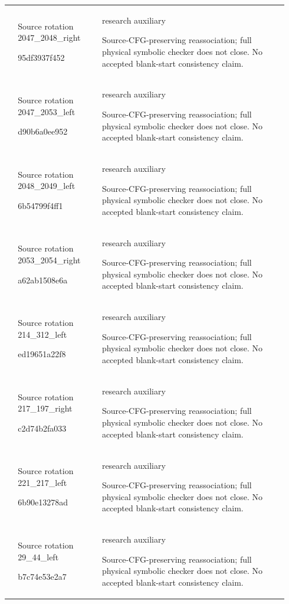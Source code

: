 {\begin{longtable}{@{}>{\raggedright\arraybackslash}p{0.035\linewidth}>{\raggedright\arraybackslash}p{0.28\linewidth}>{\raggedright\arraybackslash}p{0.625\linewidth}@{}}
62 & Source rotation 2047\_2048\_right\par{\ttfamily 95df3937f452} & research auxiliary\par Source-CFG-preserving reassociation; full physical symbolic checker does not close. No accepted blank-start consistency claim.\\[4pt]
63 & Source rotation 2047\_2053\_left\par{\ttfamily d90b6a0ee952} & research auxiliary\par Source-CFG-preserving reassociation; full physical symbolic checker does not close. No accepted blank-start consistency claim.\\[4pt]
64 & Source rotation 2048\_2049\_left\par{\ttfamily 6b54799f4ff1} & research auxiliary\par Source-CFG-preserving reassociation; full physical symbolic checker does not close. No accepted blank-start consistency claim.\\[4pt]
65 & Source rotation 2053\_2054\_right\par{\ttfamily a62ab1508e6a} & research auxiliary\par Source-CFG-preserving reassociation; full physical symbolic checker does not close. No accepted blank-start consistency claim.\\[4pt]
66 & Source rotation 214\_312\_left\par{\ttfamily ed19651a22f8} & research auxiliary\par Source-CFG-preserving reassociation; full physical symbolic checker does not close. No accepted blank-start consistency claim.\\[4pt]
67 & Source rotation 217\_197\_right\par{\ttfamily c2d74b2fa033} & research auxiliary\par Source-CFG-preserving reassociation; full physical symbolic checker does not close. No accepted blank-start consistency claim.\\[4pt]
68 & Source rotation 221\_217\_left\par{\ttfamily 6b90e13278ad} & research auxiliary\par Source-CFG-preserving reassociation; full physical symbolic checker does not close. No accepted blank-start consistency claim.\\[4pt]
69 & Source rotation 29\_44\_left\par{\ttfamily b7c74e53e2a7} & research auxiliary\par Source-CFG-preserving reassociation; full physical symbolic checker does not close. No accepted blank-start consistency claim.\\[4pt]

\end{longtable}}
